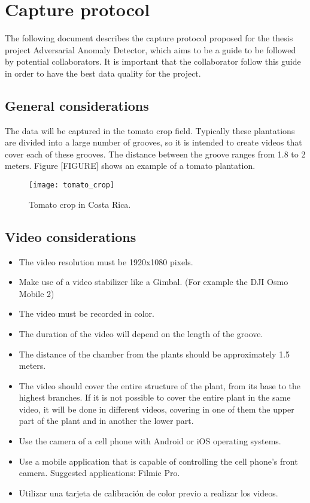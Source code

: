 \chapter{Capture protocol}

The following document describes the capture protocol proposed for the thesis project Adversarial Anomaly Detector, which aims to be a guide to be followed by potential collaborators. It is important that the collaborator follow this guide in order to have the best data quality for the project.

\section{General considerations}

The data will be captured in the tomato crop field. Typically these plantations are divided into a large number of grooves, so it is intended to create videos that cover each of these grooves. The distance between the groove ranges from 1.8 to 2 meters. Figure [FIGURE] shows an example of a tomato plantation.

\begin{figure}[htb]
  \centering
  \texttt{[image: tomato\_crop]}
  \caption[Tomato crop]{Tomato crop in Costa Rica.}
  \label{fig:tomato_crop}
\end{figure}

\section{Video considerations}

\begin{itemize}
 \item The video resolution must be 1920x1080 pixels.
 \item Make use of a video stabilizer like a Gimbal. (For example the DJI Osmo Mobile 2)
 \item The video must be recorded in color.
 \item The duration of the video will depend on the length of the groove.
 \item The distance of the chamber from the plants should be approximately 1.5 meters.
 \item The video should cover the entire structure of the plant, from its base to the highest branches. If it is not possible to cover the entire plant in the same video, it will be done in different videos, covering in one of them the upper part of the plant and in another the lower part.
 \item Use the camera of a cell phone with Android or iOS operating systems.
 \item Use a mobile application that is capable of controlling the cell phone's front camera. Suggested applications: Filmic Pro.
 \item Utilizar una tarjeta de calibración de color previo a realizar los videos.
\end{itemize}

